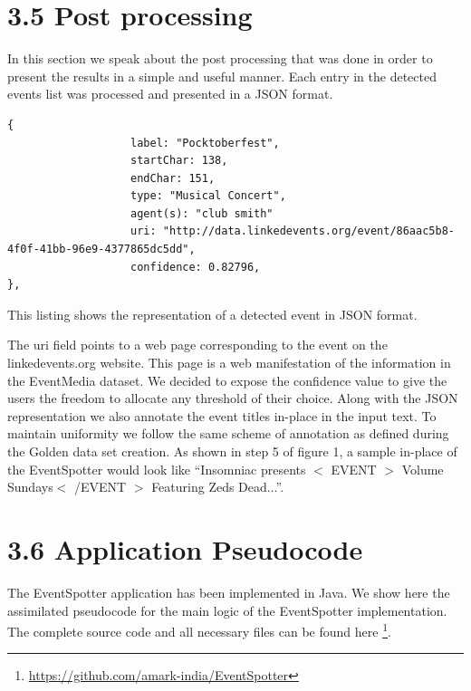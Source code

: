\documentclass[a4paper,11pt]{report}
\begin{document}

\section*{3.5 Post processing}

In this section we speak about the post processing that was done in order to present the results in a simple and useful manner. Each entry in the detected events list was processed and presented in a JSON format. \newline


\begin{lstlisting}
{
                   label: "Pocktoberfest",
                   startChar: 138,
                   endChar: 151,
                   type: "Musical Concert",
                   agent(s): "club smith"
                   uri: "http://data.linkedevents.org/event/86aac5b8-4f0f-41bb-96e9-4377865dc5dd",
                   confidence: 0.82796,
},
\end{lstlisting}
This listing shows the representation of a detected event in JSON format.\newline \newline

The uri field points to a web page corresponding to the event on the linkedevents.org website. This page is a  web manifestation of the information in the EventMedia dataset. We decided to expose the confidence value to give the users the freedom to allocate any threshold of their choice. Along with the JSON representation we also annotate the event titles in-place in the input text. To maintain uniformity we follow the same scheme of annotation as defined during the Golden data set creation. As shown in step 5 of figure 1, a sample in-place of the EventSpotter would look like ``Insomniac presents $<$ EVENT $>$ Volume Sundays$<$ /EVENT $>$ Featuring Zeds Dead...''. 

\section*{3.6 Application Pseudocode}
The EventSpotter application has been implemented in Java. We show here the assimilated pseudocode for the main logic of the EventSpotter implementation. The complete source code and all necessary files can be found here \footnote{\url{https://github.com/amark-india/EventSpotter}}. \newline
\end{document}
